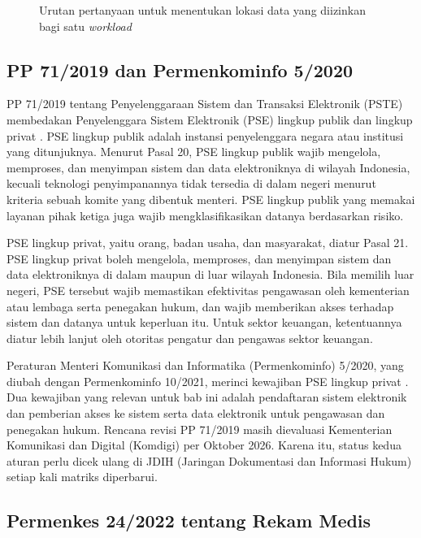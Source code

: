\begin{figure}[!htb]
  \centering
  
  \caption{Urutan pertanyaan untuk menentukan lokasi data yang diizinkan bagi satu
           \textit{workload}}
  \label{fig:ch02-alur-lokasi-data}
\end{figure}

\subsection*{PP 71/2019 dan Permenkominfo 5/2020}

PP 71/2019 tentang Penyelenggaraan Sistem dan Transaksi Elektronik (PSTE) membedakan
Penyelenggara Sistem Elektronik (PSE) lingkup publik dan lingkup privat \cite{pp71-2019}.
PSE lingkup publik adalah instansi penyelenggara negara atau institusi yang ditunjuknya.
Menurut Pasal 20, PSE lingkup publik wajib mengelola, memproses, dan menyimpan sistem dan
data elektroniknya di wilayah Indonesia, kecuali teknologi penyimpanannya tidak tersedia di
dalam negeri menurut kriteria sebuah komite yang dibentuk menteri. PSE lingkup publik yang
memakai layanan pihak ketiga juga wajib mengklasifikasikan datanya berdasarkan risiko.

PSE lingkup privat, yaitu orang, badan usaha, dan masyarakat, diatur Pasal 21. PSE lingkup
privat boleh mengelola, memproses, dan menyimpan sistem dan data elektroniknya di dalam
maupun di luar wilayah Indonesia. Bila memilih luar negeri, PSE tersebut wajib memastikan
efektivitas pengawasan oleh kementerian atau lembaga serta penegakan hukum, dan wajib
memberikan akses terhadap sistem dan datanya untuk keperluan itu. Untuk sektor keuangan,
ketentuannya diatur lebih lanjut oleh otoritas pengatur dan pengawas sektor keuangan.

Peraturan Menteri Komunikasi dan Informatika (Permenkominfo) 5/2020, yang diubah dengan
Permenkominfo 10/2021, merinci kewajiban PSE lingkup privat \cite{c02-permenkominfo5-2020}.
Dua kewajiban yang relevan untuk bab ini adalah pendaftaran sistem elektronik dan pemberian
akses ke sistem serta data elektronik untuk pengawasan dan penegakan hukum. Rencana revisi
PP 71/2019 masih dievaluasi Kementerian Komunikasi dan Digital (Komdigi) per Oktober 2026.
Karena itu, status kedua aturan perlu dicek ulang di JDIH (Jaringan Dokumentasi dan
Informasi Hukum) setiap kali matriks diperbarui.

\subsection*{Permenkes 24/2022 tentang Rekam Medis}

